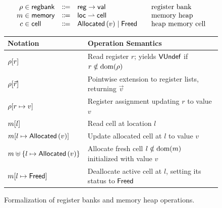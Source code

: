 \documentclass[report.tex]{subfiles}
\begin{document}
\begin{figure}[htp]
  \centering
  \begin{equation*}
    \begin{array}{r@{\;\in\;}l@{\quad\Coloneqq\quad}l@{\qquad}l}
      \rho & \regbank & \reg \to \val & \text{register bank} \\
      m & \mem & \loc \rightharpoonup \cell & \text{memory heap} \\
      c & \cell & \Allocated{v} \mid \Freed & \text{heap memory cell}
    \end{array}
  \end{equation*}
  \vspace{0.5em}
  \begin{tabular}{ll}
    \toprule
    Notation & Operation Semantics \\
    \midrule
    $\getreg{r}{\rho}$ & Read register $r$;
    yields $\VUndef$ if $r \notin \dom{\rho}$ \\
    $\getreg{\vec{r}}{\rho}$ & Pointwise extension to register lists,
    returning $\vec{v}$ \\
    $\setreg{r}{v}{\rho}$ & Register assignment updating $r$ to value $v$ \\
    \addlinespace
    $\getat{l}{m}$ & Read cell at location $l$ \\
    $\setat{l}{v}{m}$ & Update allocated cell at $l$ to value $v$ \\
    $\allocat{l}{v}{m}$ & Allocate fresh cell $l \notin \dom{m}$
    initialized with value $v$ \\
    $\freeat{l}{m}$ & Deallocate active cell at $l$,
    setting its status to $\Freed$ \\
    \bottomrule
  \end{tabular}
  \caption{Formalization of register banks and memory heap operations.}
  \label{fig:mem-and-reg}
\end{figure}
\end{document}
